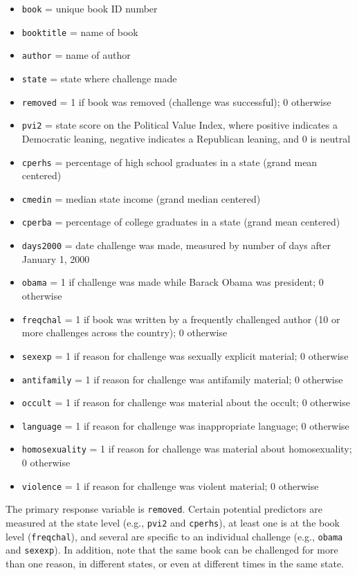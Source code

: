 \documentclass[
]{krantz}
\providecommand{\tightlist}{%
  \setlength{\itemsep}{0pt}\setlength{\parskip}{0pt}}
\begin{document}
\begin{enumerate}
  \begin{itemize}
  \tightlist
  \item
    \texttt{book} = unique book ID number
  \item
    \texttt{booktitle} = name of book
  \item
    \texttt{author} = name of author
  \item
    \texttt{state} = state where challenge made
  \item
    \texttt{removed} = 1 if book was removed (challenge was successful); 0 otherwise
  \item
    \texttt{pvi2} = state score on the Political Value Index, where positive indicates a Democratic leaning, negative indicates a Republican leaning, and 0 is neutral
  \item
    \texttt{cperhs} = percentage of high school graduates in a state (grand mean centered)
  \item
    \texttt{cmedin} = median state income (grand median centered)
  \item
    \texttt{cperba} = percentage of college graduates in a state (grand mean centered)
  \item
    \texttt{days2000} = date challenge was made, measured by number of days after January 1, 2000
  \item
    \texttt{obama} = 1 if challenge was made while Barack Obama was president; 0 otherwise
  \item
    \texttt{freqchal} = 1 if book was written by a frequently challenged author (10 or more challenges across the country); 0 otherwise
  \item
    \texttt{sexexp} = 1 if reason for challenge was sexually explicit material; 0 otherwise
  \item
    \texttt{antifamily} = 1 if reason for challenge was antifamily material; 0 otherwise
  \item
    \texttt{occult} = 1 if reason for challenge was material about the occult; 0 otherwise
  \item
    \texttt{language} = 1 if reason for challenge was inappropriate language; 0 otherwise
  \item
    \texttt{homosexuality} = 1 if reason for challenge was material about homosexuality; 0 otherwise
  \item
    \texttt{violence} = 1 if reason for challenge was violent material; 0 otherwise
  \end{itemize}

  The primary response variable is \texttt{removed}. Certain potential predictors are measured at the state level (e.g., \texttt{pvi2} and \texttt{cperhs}), at least one is at the book level (\texttt{freqchal}), and several are specific to an individual challenge (e.g., \texttt{obama} and \texttt{sexexp}). In addition, note that the same book can be challenged for more than one reason, in different states, or even at different times in the same state.


\end{enumerate}
\end{document}
